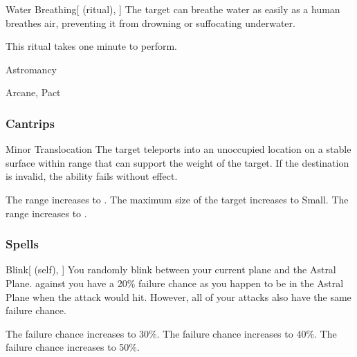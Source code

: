 \lowercase{\hypertarget{spell:Water Breathing}{}}\label{spell:Water Breathing}
\begin{attuneability}[Rank 3]{\hypertarget{spell:Water Breathing}{Water Breathing}}[ (ritual), ]
The target can breathe water as easily as a human breathes air, preventing it from drowning or suffocating underwater.

This ritual takes one minute to perform.
\end{attuneability}
\vspace{0.25em}


\newpage
\begin{spellsection}{Astromancy}

\begin{spellheader}
\end{spellheader}


 Arcane, Pact

\subsubsection{Cantrips}


\begin{freeability}{Minor Translocation}
The target teleports into an unoccupied location on a stable surface within range that can support the weight of the target.
If the destination is invalid, the ability fails without effect.

\rankline
{} The range increases to \rngmed.
 The maximum size of the target increases to Small.
 The range increases to \rnglong.
\end{freeability}

\end{spellsection}


\subsubsection{Spells}


\lowercase{\hypertarget{spell:Blink}{}}\label{spell:Blink}
\begin{attuneability}[Rank 1]{\hypertarget{spell:Blink}{Blink}}[ (self), ]
You randomly blink between your current plane and the Astral Plane.
  against you have a 20\% failure chance as you happen to be in the Astral Plane when the attack would hit.
However, all of your attacks also have the same failure chance.

\rankline
{} The failure chance increases to 30\%.
 The failure chance increases to 40\%.
 The failure chance increases to 50\%.
\end{attuneability}
\vspace{0.25em}



